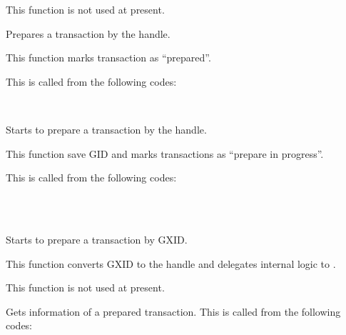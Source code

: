     This function is not used at present.
  
  
    Prepares a transaction by the handle.
    
    This function marks transaction as ``prepared''.
    
    This is called from the following codes:
    
	{
		\footnotesize
		\FuncRefHdr
			\\ \hline
		\FuncRefTrailor
	}
  
  
    Starts to prepare a transaction by the handle.
    
    This function save GID and marks transactions as ``prepare in progress''.
    
    This is called from the following codes:
    
	{
		\footnotesize
		\FuncRefHdr
			\\
			\\ \hline
		\FuncRefTrailor
	}
  
  
    Starts to prepare a transaction by GXID.
    
    This function converts GXID to the handle and delegates internal logic to  .
    
    This function is not used at present.
  
  
    Gets information of a prepared transaction.
    This is called from the following codes:
    
	{
		\footnotesize
		\FuncRefHdr
			\\ \hline
		\FuncRefTrailor
	}
  
